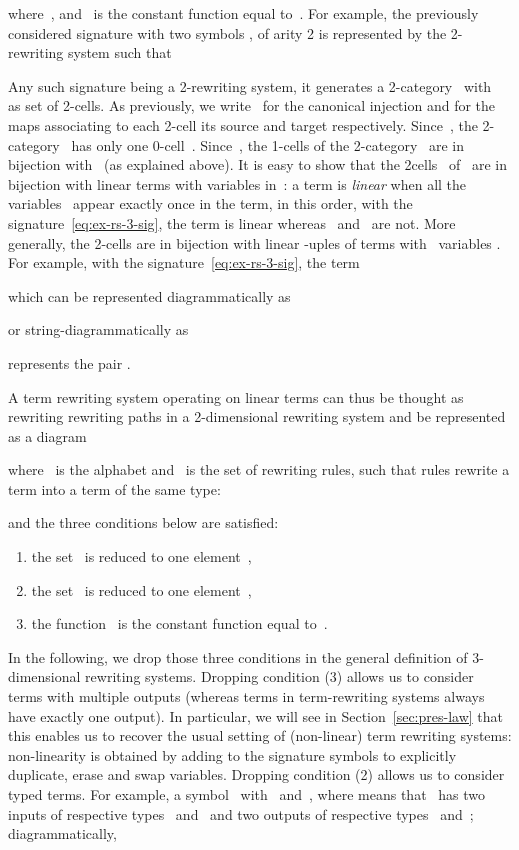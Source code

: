 \documentclass{LMCS}
\begin{document}
where~,  and~ is the constant function equal
to~. For example, the previously considered signature with two symbols ,
 of arity 2 is represented by the 2-rewriting system such that


Any such signature being a 2-rewriting system, it generates a 2-category~
with~ as set of 2-cells. As previously, we write~ for
the canonical injection and \hbox{} for the maps
associating to each 2-cell its source and target respectively. Since~,
the 2-category~ has only one 0-cell~. Since~, the 1-cells of
the 2-category~ are in bijection with~ (as explained above). It is easy
to show that the 2\nbd{}cells~ of~ are in bijection
with linear terms with variables in~: a term is \emph{linear}
when all the variables~ appear exactly once in the term, in this
order, \eg with the signature~\eqref{eq:ex-rs-3-sig}, the term
 is linear whereas~ and~ are
not. More generally, the 2-cells  are in bijection with
linear -uples of terms with~ variables . For example, with
the signature~\eqref{eq:ex-rs-3-sig}, the term

which can be represented diagrammatically as

or string-diagrammatically as

represents the pair .

A term rewriting system operating on linear terms can thus be thought as
rewriting rewriting paths in a 2-dimensional rewriting system and be represented
as a diagram

where~ is the alphabet and~ is the set of rewriting rules, such that
rules rewrite a term into a term of the same type:

and the three conditions below are satisfied:
\begin{enumerate}
\item the set~ is reduced to one element~,
\item the set~ is reduced to one element~,
\item the function~ is the constant function equal to~.
\end{enumerate}
In the following, we drop those three conditions in the general definition of
3-dimensional rewriting systems. Dropping condition (3) allows us to consider
terms with multiple outputs (whereas terms in term-rewriting systems always have
exactly one output). In particular, we will see in Section~\ref{sec:pres-law}
that this enables us to recover the usual setting of (non-linear) term rewriting
systems: non-linearity is obtained by adding to the signature symbols to
explicitly duplicate, erase and swap variables. Dropping condition (2) allows us
to consider typed terms. For example, a symbol~ with~ and~, where  means that~ has two inputs
of respective types~ and~ and two outputs of respective types~ and~;
diagrammatically,
\end{document}
